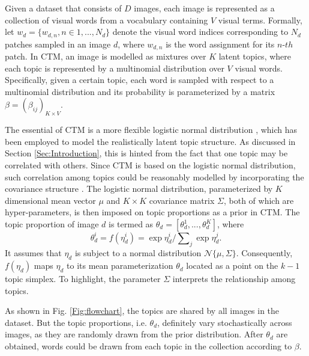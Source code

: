 \documentclass[journal]{IEEEtran}
\begin{document}
Given a dataset that consists of $D$ images, each image is represented as a collection of visual words from a vocabulary containing $V$ visual terms. Formally, let ${w_d} = \{ {w_{d,n}},n \in 1,...,{N_d}\}$ denote the visual word indices corresponding to $N_d$ patches sampled in an image $d$, where $w_{d,n}$ is the word assignment for its $n$-$th$ patch. In CTM, an image is modelled as mixtures over $K$ latent topics, where each topic is represented by a multinomial distribution over $V$ visual words. Specifically, given a certain topic, each word is sampled with respect to a multinomial distribution and its probability is parameterized by a matrix $\beta  = {({\beta _{ij}})_{K \times V}}$.

The essential of CTM is a more flexible logistic normal distribution \cite{aitchison1986statistical}, which has been employed to model the realistically latent topic structure. As discussed in Section \ref{Sec:Introduction}, this is hinted from the fact that one topic may be correlated with others. Since CTM is based on the logistic normal distribution, such correlation among topics could be reasonably modelled by incorporating the covariance structure \cite{blei2007correction}. The logistic normal distribution, parameterized by $K$ dimensional mean vector $\mu$ and $K \times K$ covariance matrix $\Sigma$, both of which are hyper-parameters, is then imposed on topic proportions as a prior in CTM. The topic proportion of image $d$ is termed as ${\theta _d} = [\theta _d^1,...,\theta _d^K]$, where
\begin{equation}
   \theta _d^i = f(\eta _d^i) = \exp \eta _d^i/\sum\nolimits_j {\exp \eta _d^j}.
\end{equation}
It assumes that $\eta_d$ is subject to a normal distribution $\mathcal{N}\{\mu,\Sigma\}$. Consequently, $f({\eta _d})$ maps $\eta_d$ to its mean parameterization $\theta_d$ located as a point on the $k-1$ topic simplex. To highlight, the parameter $\Sigma$ interprets the relationship among topics.

As shown in Fig. \ref{Fig:flowchart}, the topics are shared by all images in the dataset. But the topic proportions, i.e. $\theta_d$, definitely vary stochastically across images, as they are randomly drawn from the prior distribution. After $\theta_d$ are obtained, words could be drawn from each topic in the collection according to $\beta$. %
\end{document}
